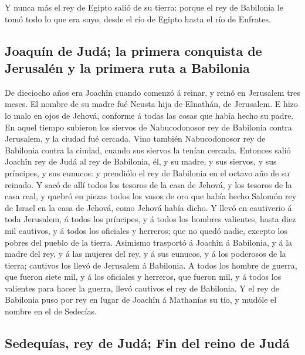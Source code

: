  Y nunca más el rey de Egipto salió de su tierra: porque el
rey de Babilonia le tomó todo lo que era suyo, desde el río de Egipto
hasta el río de Eufrates.

\hypertarget{joaquuxedn-de-juduxe1-la-primera-conquista-de-jerusaluxe9n-y-la-primera-ruta-a-babilonia}{%
\subsection{Joaquín de Judá; la primera conquista de Jerusalén y la
primera ruta a
Babilonia}\label{joaquuxedn-de-juduxe1-la-primera-conquista-de-jerusaluxe9n-y-la-primera-ruta-a-babilonia}}

 De dieciocho años era Joachîn cuando comenzó á reinar, y
reinó en Jerusalem tres meses. El nombre de su madre fué Neusta hija de
Elnathán, de Jerusalem.  E hizo lo malo en ojos de Jehová,
conforme á todas las cosas que había hecho su padre.  En
aquel tiempo subieron los siervos de Nabucodonosor rey de Babilonia
contra Jerusalem, y la ciudad fué cercada.  Vino también
Nabucodonosor rey de Babilonia contra la ciudad, cuando sus siervos la
tenían cercada.  Entonces salió Joachîn rey de Judá al rey
de Babilonia, él, y su madre, y sus siervos, y sus príncipes, y sus
eunucos: y prendiólo el rey de Babilonia en el octavo año de su reinado.
 Y sacó de allí todos los tesoros de la casa de Jehová, y
los tesoros de la casa real, y quebró en piezas todos los vasos de oro
que había hecho Salomón rey de Israel en la casa de Jehová, como Jehová
había dicho.  Y llevó en cautiverio á toda Jerusalem, á
todos los príncipes, y á todos los hombres valientes, hasta diez mil
cautivos, y á todos los oficiales y herreros; que no quedó nadie,
excepto los pobres del pueblo de la tierra.  Asimismo
trasportó á Joachîn á Babilonia, y á la madre del rey, y á las mujeres
del rey, y á sus eunucos, y á los poderosos de la tierra; cautivos los
llevó de Jerusalem á Babilonia.  A todos los hombre de
guerra, que fueron siete mil, y á los oficiales y herreros, que fueron
mil, y á todos los valientes para hacer la guerra, llevó cautivos el rey
de Babilonia.  Y el rey de Babilonia puso por rey en lugar
de Joachîn á Mathanías su tío, y mudóle el nombre en el de Sedecías.

\hypertarget{sedequuxedas-rey-de-juduxe1-fin-del-reino-de-juduxe1}{%
\subsection{Sedequías, rey de Judá; Fin del reino de
Judá}\label{sedequuxedas-rey-de-juduxe1-fin-del-reino-de-juduxe1}}


